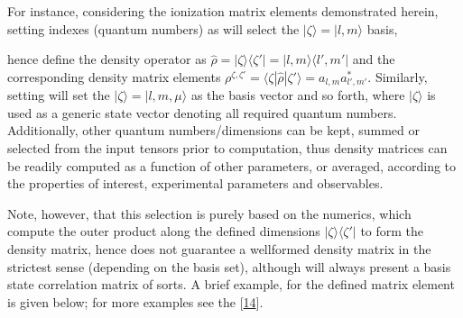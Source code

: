 \documentclass[letterpaper,table,10pt,english]{jupyterBook}
\begin{document}
\sphinxAtStartPar
For instance, considering the ionization matrix elements demonstrated herein, setting indexes (quantum numbers) as \sphinxcode{\sphinxupquote{{[}l,m{]}}} will select the \(|\zeta\rangle = |l,m\rangle\) basis,

\sphinxAtStartPar
hence define the density operator as \(\hat{\rho} = |\zeta\rangle \langle\zeta'| = |l,m\rangle\langle l',m'|\) and the corresponding density matrix elements \(\rho^{\zeta,\zeta'}=\langle\zeta|\hat{\rho}|\zeta'\rangle=a_{l,m}a_{l',m'}^{*}\). Similarly, setting \sphinxcode{\sphinxupquote{{[}'l','m','mu'{]}}} will set the \(|\zeta\rangle = |l,m,\mu\rangle\) as the basis vector and so forth, where \(|\zeta\rangle\) is used as a generic state vector denoting all required quantum numbers. Additionally, other quantum numbers/dimensions can be kept, summed or selected from the input tensors prior to computation, thus density matrices can be readily computed as a function of other parameters, or averaged, according to the properties of interest, experimental parameters and observables.

\sphinxAtStartPar
Note, however, that this selection is purely based on the numerics, which compute the outer product along the defined dimensions \(|\zeta\rangle\langle\zeta'|\) to form the density matrix, hence does not guarantee a well\sphinxhyphen{}formed density matrix in the strictest sense (depending on the basis set), although will always present a basis state correlation matrix of sorts. A brief example, for the  defined matrix element is given below; for more examples see the  {[}\hyperlink{cite.backmatter/bibliography:id545}{14}{]}.
\end{document}

